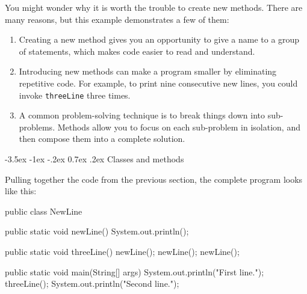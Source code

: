 \documentclass[12pt]{book}
\makeatletter
\theoremstyle{exercise}
\newcommand{\java}[1]{\verb"#1"}
\renewcommand{\section}{\@startsection{section}{1}{\z@}%
    {-3.5ex \@plus -1ex \@minus -.2ex}%
    {0.7ex \@plus.2ex}%
    {\normalfont\Large\bfseries}}
\newcommand{\java}[1]{\lstinline{#1}} %
\makeatother
\begin{document}

You might wonder why it is worth the trouble to create new methods.
There are many reasons, but this example demonstrates a few of them:

\begin{enumerate}

\item Creating a new method gives you an opportunity to give a name to a group of statements, which makes code easier to read and understand.

\item Introducing new methods can make a program smaller by eliminating repetitive code.
For example, to print nine consecutive new lines, you could invoke \java{threeLine} three times.

\item A common problem-solving technique is to break things down into sub-problems.
Methods allow you to focus on each sub-problem in isolation, and then compose them into a complete solution.

\end{enumerate}




\section{Classes and methods}


Pulling together the code from the previous section, the complete program looks like this:

\begin{code}
public class NewLine {

    public static void newLine() {
        System.out.println();
    }

    public static void threeLine() {
        newLine();
        newLine();
        newLine();
    }

    public static void main(String[] args) {
        System.out.println("First line.");
        threeLine();
        System.out.println("Second line.");
    }
}
\end{code}
\end{document}

